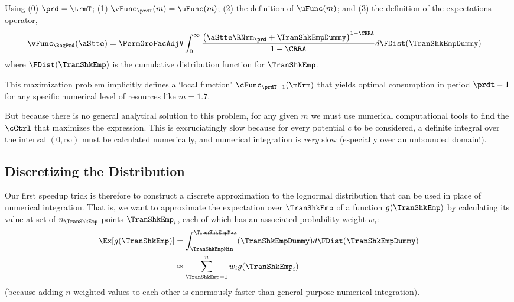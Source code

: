 \documentclass[\econtexRoot/SolvingMicroDSOPs]{subfiles}
\begin{document}
Using (0) $\prd=\trmT$; (1) $\vFunc_{\prdT}({m})=\uFunc({m})$; (2) the definition of $\uFunc({m})$; and (3) the definition of the expectations operator,  %
\begin{equation}\begin{gathered}\begin{aligned}
      {\vFunc}_{\BegPrd}(\aStte)   & = \PermGroFacAdjV\int_{0}^{\infty} \frac{\left(\aStte \RNrm_{\prd}+ \TranShkEmpDummy\right)^{1-\CRRA}}{1-\CRRA}  d\FDist(\TranShkEmpDummy) \label{eq:NumDefInt}
    \end{aligned}\end{gathered}\end{equation}
where $\FDist(\TranShkEmp)$ is the cumulative distribution function for ${\TranShkEmp}$.

\lstset{basicstyle=\ttfamily\footnotesize,breaklines=true,language=Python,frame=single}


This maximization problem implicitly defines a `local function' $\cFunc_{\prdT-1}({\mNrm})$ that yields optimal consumption in period $\prdt-1$ for any specific numerical level of resources like ${m}=1.7$.%

But because there is no general analytical solution to this problem, for any given ${m}$ we must use numerical computational tools to find the $\cCtrl$ that maximizes the expression.  This is excruciatingly slow because for every potential ${c}$ to be considered, a definite integral over the interval $(0,\infty)$ must be calculated numerically, and numerical integration is \textit{very} slow (especially over an unbounded domain!).

\hypertarget{discretizing-the-distribution}{}
\subsection{Discretizing the Distribution}
Our first speedup trick is therefore to construct a discrete approximation to the lognormal distribution that can be used in place of numerical integration.  That is, we want to approximate the expectation over $\TranShkEmp$ of a function $g(\TranShkEmp)$ by calculating its value at set of $n_{\TranShkEmp}$ points $\TranShkEmp_{i}$, each of which has an associated probability weight $w_{i}$:
\begin{equation*}\begin{gathered}\begin{aligned}
      \Ex[g(\TranShkEmp)] & = \int_{\TranShkEmpMin}^{\TranShkEmpMax}(\TranShkEmpDummy)d\FDist(\TranShkEmpDummy) \\
      & \approx \sum_{\TranShkEmp = 1}^{n}w_{i}g(\TranShkEmp_{i})
    \end{aligned}\end{gathered}\end{equation*}
(because adding $n$ weighted values to each other is enormously faster than general-purpose numerical integration).
\end{document}
